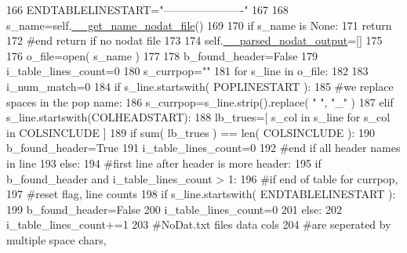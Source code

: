 \begin{DoxyCode}
166         ENDTABLELINESTART=\textcolor{stringliteral}{"----------------------"}  
167 
168         s\_name=self.\hyperlink{classnegui_1_1pgoutputneestimator_1_1PGOutputNeEstimator_ab1fea13d322982ecc8b5fbe42741de50}{\_\_get\_name\_nodat\_file}()
169 
170         \textcolor{keywordflow}{if} s\_name \textcolor{keywordflow}{is} \textcolor{keywordtype}{None}:
171             \textcolor{keywordflow}{return}
172         \textcolor{comment}{#end return if no nodat file}
173 
174         self.\hyperlink{classnegui_1_1pgoutputneestimator_1_1PGOutputNeEstimator_acd31d6f910fc03d1945e38b6c4fa79c0}{\_\_parsed\_nodat\_output}=[]
175 
176         o\_file=open( s\_name )
177 
178         b\_found\_header=\textcolor{keyword}{False}
179         i\_table\_lines\_count=0
180         s\_currpop=\textcolor{stringliteral}{""}
181         \textcolor{keywordflow}{for} s\_line \textcolor{keywordflow}{in} o\_file:
182 
183             i\_num\_match=0
184             \textcolor{keywordflow}{if} s\_line.startswith( POPLINESTART ):
185                 \textcolor{comment}{#we replace spaces in the pop name:}
186                 s\_currpop=s\_line.strip().replace( \textcolor{stringliteral}{" "}, \textcolor{stringliteral}{"\_"} )
187             \textcolor{keywordflow}{elif} s\_line.startswith(COLHEADSTART):
188                 lb\_trues=[ s\_col \textcolor{keywordflow}{in} s\_line \textcolor{keywordflow}{for} s\_col \textcolor{keywordflow}{in} COLSINCLUDE ]
189                 \textcolor{keywordflow}{if} sum( lb\_trues ) == len( COLSINCLUDE ):
190                     b\_found\_header=\textcolor{keyword}{True}
191                     i\_table\_lines\_count=0
192                 \textcolor{comment}{#end if all header names in line}
193             \textcolor{keywordflow}{else}:
194                 \textcolor{comment}{#first line after header is more header:}
195                 \textcolor{keywordflow}{if} b\_found\_header \textcolor{keywordflow}{and} i\_table\_lines\_count > 1:
196                     \textcolor{comment}{#if end of table for currpop, }
197                     \textcolor{comment}{#reset flag, line counts}
198                     \textcolor{keywordflow}{if} s\_line.startswith( ENDTABLELINESTART ):
199                         b\_found\_header=\textcolor{keyword}{False}
200                         i\_table\_lines\_count=0
201                     \textcolor{keywordflow}{else}:
202                         i\_table\_lines\_count+=1
203                         \textcolor{comment}{#NoDat.txt files data cols}
204                         \textcolor{comment}{#are seperated by multiple space chars,}

\end{DoxyCode}
